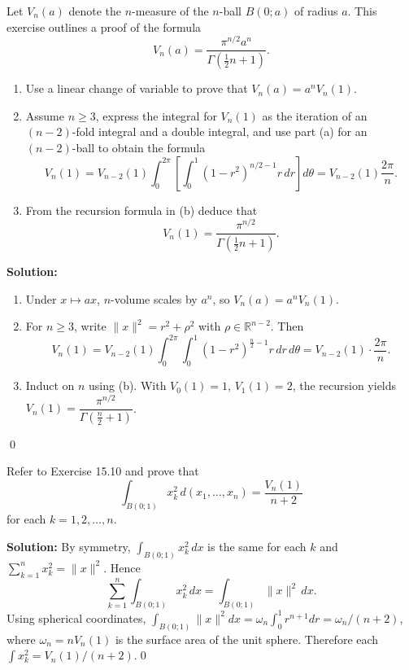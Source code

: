 \begin{problembox}
Let \( V_n(a) \) denote the \( n \)-measure of the \( n \)-ball \( B(0; a) \) of radius \( a \). This exercise outlines a proof of the formula
\[
V_n(a) = \frac{\pi^{n/2} a^n}{\Gamma( \frac{1}{2} n + 1 )}.
\]
\begin{enumerate}[label=(\alph*)]
\item Use a linear change of variable to prove that \( V_n(a) = a^n V_n(1) \).
\item Assume \( n \geq 3 \), express the integral for \( V_n(1) \) as the iteration of an \( (n - 2) \)-fold integral and a double integral, and use part (a) for an \( (n - 2) \)-ball to obtain the formula
\[
V_n(1) = V_{n-2}(1) \int_0^{2\pi} \left[ \int_0^1 (1 - r^2)^{n/2 - 1}r \, dr \right] d\theta = V_{n-2}(1) \frac{2\pi}{n}.
\]
\item From the recursion formula in (b) deduce that
\[
V_n(1) = \frac{\pi^{n/2}}{\Gamma(\frac{1}{2}n + 1)}.
\]
\end{enumerate}
\end{problembox}

\noindent\textbf{Solution:}
\begin{enumerate}[label=(\alph*)]
\item Under \(x\mapsto ax\), \(n\)-volume scales by \(a^n\), so \(V_n(a)=a^n V_n(1)\).
\item For \(n\ge 3\), write \(\|x\|^2=r^2+\rho^2\) with \(\rho\in\mathbb{R}^{n-2}\). Then
\[
V_n(1)=V_{n-2}(1)\int_0^{2\pi}\!\int_0^1 (1-r^2)^{\frac{n}{2}-1} r\,dr\,d\theta = V_{n-2}(1)\cdot \frac{2\pi}{n}.
\]
\item Induct on \(n\) using (b). With \(V_0(1)=1\), \(V_1(1)=2\), the recursion yields \(V_n(1)=\dfrac{\pi^{n/2}}{\Gamma(\tfrac{n}{2}+1)}\).
\end{enumerate}\qed


\begin{problembox}
Refer to Exercise 15.10 and prove that
\[
\int_{B(0;1)} x_k^2 \, d(x_1, \ldots, x_n) = \frac{V_n(1)}{n + 2}
\]
for each \( k = 1, 2, \ldots, n \).
\end{problembox}

\noindent\textbf{Solution:}
By symmetry, \(\int_{B(0;1)} x_k^2\,dx\) is the same for each \(k\) and \(\sum_{k=1}^n x_k^2=\|x\|^2\). Hence
\[
\sum_{k=1}^n \int_{B(0;1)} x_k^2\,dx = \int_{B(0;1)} \|x\|^2\,dx.
\]
Using spherical coordinates, \(\int_{B(0;1)} \|x\|^2 dx = \omega_{n}\int_0^1 r^{n+1}dr=\omega_n/(n+2)\), where \(\omega_n= n V_n(1)\) is the surface area of the unit sphere. Therefore each \(\int x_k^2 = V_n(1)/(n+2)\).\qed


